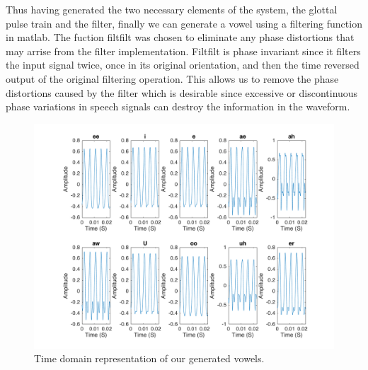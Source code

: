 \documentclass{article}
\begin{document}
Thus having generated the two necessary elements of the system, the glottal pulse train and the filter, finally we can generate a vowel using a filtering function in matlab. The fuction filtfilt was chosen to eliminate any phase distortions that may arrise from the filter implementation. Filtfilt is phase invariant since it filters the input signal twice, once in its original orientation, and then the time reversed output of the original filtering operation. This allows us to remove the phase distortions caused by the filter which is desirable since excessive or discontinuous phase variations in speech signals can destroy the information in the waveform. 
\begin{figure}[h]
  \centering
    \includegraphics[width=.6\textwidth]{vowels_time.png}
  \caption{Time domain representation of our generated vowels.}
  \label{fig:vowels_time}
\end{figure}
\end{document}
